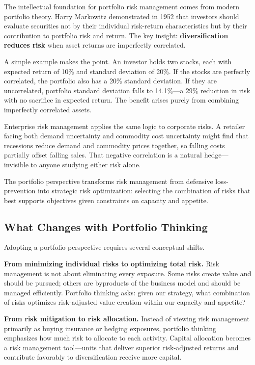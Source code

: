 \documentclass[11pt,openany]{book}
\begin{document}
The intellectual foundation for portfolio risk management comes from modern
portfolio theory. Harry Markowitz demonstrated in 1952 that investors should
evaluate securities not by their individual risk-return characteristics but by
their contribution to portfolio risk and return. The key insight:
\textbf{diversification reduces risk} when asset returns are imperfectly
correlated.

A simple example makes the point. An investor holds two stocks, each with
expected return of 10\% and standard deviation of 20\%. If the stocks are
perfectly correlated, the portfolio also has a 20\% standard deviation. If
they are uncorrelated, portfolio standard deviation falls to 14.1\%---a 29\%
reduction in risk with no sacrifice in expected return. The benefit arises
purely from combining imperfectly correlated assets.

Enterprise risk management applies the same logic to corporate risks. A
retailer facing both demand uncertainty and commodity cost uncertainty might
find that recessions reduce demand and commodity prices together, so falling
costs partially offset falling sales. That negative correlation is a natural
hedge---invisible to anyone studying either risk alone.

The portfolio perspective transforms risk management from defensive
loss-prevention into strategic risk optimization: selecting the combination of
risks that best supports objectives given constraints on capacity and
appetite.

\subsection{What Changes with Portfolio Thinking}
\label{subsec:portfolio-shifts}

Adopting a portfolio perspective requires several conceptual shifts.

\textbf{From minimizing individual risks to optimizing total risk.} Risk
management is not about eliminating every exposure. Some risks create value
and should be pursued; others are byproducts of the business model and should
be managed efficiently. Portfolio thinking asks: given our strategy, what
combination of risks optimizes risk-adjusted value creation within our
capacity and appetite?

\textbf{From risk mitigation to risk allocation.} Instead of viewing risk
management primarily as buying insurance or hedging exposures, portfolio
thinking emphasizes how much risk to allocate to each activity. Capital
allocation becomes a risk management tool---units that deliver superior
risk-adjusted returns and contribute favorably to diversification receive more
capital.
\end{document}
